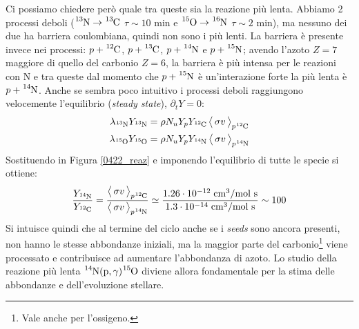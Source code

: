 \noindent Ci possiamo chiedere però quale tra queste sia la reazione più lenta. Abbiamo 2 processi deboli ($\ce{^{13}N}\to\ce{^{13}C}$ $\tau\sim 10$ min e $\ce{^{15}O}\to\ce{^{16}N}$ $\tau\sim 2$ min), ma nessuno dei due ha barriera coulombiana, quindi non sono i più lenti. La barriera è presente invece nei processi: $p+\ce{^{12}C}$, $p+\ce{^{13}C}$, $p+\ce{^{14}N}$ e $p+\ce{^{15}N}$; avendo l'azoto $Z=7$ maggiore di quello del carbonio $Z=6$, la barriera è più intensa per le reazioni con N e tra queste dal momento che $p+\ce{^{15}N}$ è un'interazione forte la più lenta è $p+\ce{^{14}N}$. Anche se sembra poco intuitivo i processi deboli raggiungono velocemente l'equilibrio (\textit{steady state}), $\partial_t Y =0$:
\begin{align*}
	\lambda_{\ce{^{13}N}} Y_{\ce{^{13}N}} &= \rho N_u Y_p Y_{\ce{^{12}C}} \, \mean{\sigma v}_{p\ce{^{12}C}} \\
	\lambda_{\ce{^{15}O}} Y_{\ce{^{15}O}} &= \rho N_u Y_p Y_{\ce{^{14}N}} \, \mean{\sigma v}_{p\ce{^{14}N}}	
\end{align*}
\noindent Sostituendo in Figura \ref{0422_reaz} e imponendo l'equilibrio di tutte le specie si ottiene:
$$\frac{Y_{\ce{^{14}N}}}{Y_{\ce{^{12}C}}} = \frac{\mean{\sigma v}_{p\ce{^{12}C}}}{\mean{\sigma v}_{p\ce{^{14}N}}} \simeq \frac{1.26 \cdot\ord{-12}\unit{cm}^3/\mbox{mol s}}{1.3 \cdot\ord{-14}\unit{cm}^3/\mbox{mol s}}\sim 100$$
Si intuisce quindi che al termine del ciclo anche se i \textit{seeds} sono ancora presenti, non hanno le stesse abbondanze iniziali, ma la maggior parte del carbonio\footnote{Vale anche per l'ossigeno.} viene processato e contribuisce ad aumentare l'abbondanza di azoto. Lo studio della reazione più lenta $\ce{^{14}N(p,\gamma)\ce{^{15}O}}$ diviene allora fondamentale per la stima delle abbondanze e dell'evoluzione stellare.

